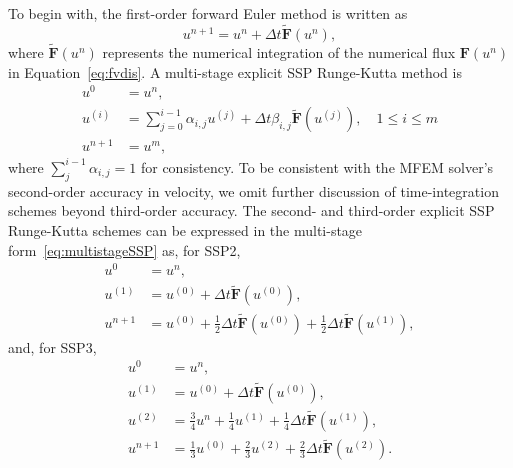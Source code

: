 To begin with, the first-order forward Euler method is written as
\begin{equation}
u^{n+1} = u^n + \Delta t \tilde{\mathbf{F}}(u^n),
\end{equation}
where $\tilde{\mathbf{F}}(u^n)$ represents the numerical integration of the numerical flux $\mathbf{F}(u^n)$
in Equation~\eqref{eq:fvdis}.
A multi-stage explicit SSP Runge-Kutta  method is
\begin{equation}\label{eq:multistageSSP}
\begin{aligned}
		  u^{0} &= u^n ,\\
		  u^{(i)}   &= \sum_{j=0}^{i-1} \alpha_{i,j}u^{(j)} + \Delta t \beta_{i,j} \tilde{\mathbf{F}}(u^{(j)}), \quad 1\leq i \leq m\\
		  u^{n+1} &= u^m,
\end{aligned}
\end{equation}
where $\sum_{j}^{i-1} \alpha_{i,j} = 1$ for consistency. 
To be consistent with the MFEM solver's second-order accuracy in velocity, we omit further discussion 
of time-integration schemes beyond third-order accuracy.
The second- and third-order explicit SSP Runge-Kutta schemes can be expressed in the 
multi-stage form~\eqref{eq:multistageSSP} as, for SSP2,
\begin{equation}\label{eq:2ndrk}
\begin{aligned}
		  u^{0}   &= u^n,\\
		  u^{(1)} &= u^{(0)} + \Delta t \tilde{\mathbf{F}}(u^{(0)}),\\
		  u^{n+1} &= u^{(0)} + \frac{1}{2} \Delta t \tilde{\mathbf{F}}(u^{(0)}) + \frac{1}{2} \Delta t \tilde{\mathbf{F}}(u^{(1)}),
\end{aligned}
\end{equation}
and, for SSP3,
\begin{equation}
\begin{aligned}
		  u^{0}   &= u^n ,\\
		  u^{(1)} &= u^{(0)} + \Delta t \tilde{\mathbf{F}}(u^{(0)}),\\
		  u^{(2)} &= \frac{3}{4} u^n + \frac{1}{4} u^{(1)} + \frac{1}{4} \Delta t \tilde{\mathbf{F}}(u^{(1)}),\\
		  u^{n+1} &= \frac{1}{3} u^{(0)}+\frac{2}{3}u^{(2)} + \frac{2}{3}\Delta t \tilde{\mathbf{F}}(u^{(2)}).
\end{aligned}
\end{equation}

